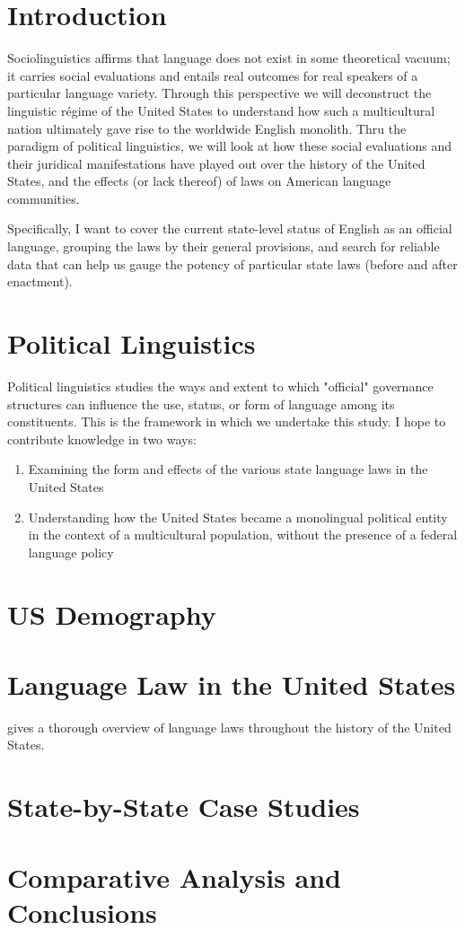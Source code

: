 \documentclass{article}
\begin{document}
\section*{Introduction}

Sociolinguistics affirms that language does not exist in some theoretical
vacuum; it carries social evaluations and entails real outcomes for real
speakers of a particular language variety. Through this perspective we will
deconstruct the linguistic régime of the United States to understand how such a
multicultural nation ultimately gave rise to the worldwide English monolith.
Thru the paradigm of political linguistics, we will look at how these social
evaluations and their juridical manifestations have played out over the history
of the United States, and the effects (or lack thereof) of laws on American
language communities.

Specifically, I want to cover the current state-level status of English as an
official language, grouping the laws by their general provisions, and search for
reliable data that can help us gauge the potency of particular state laws
(before and after enactment).

\section*{Political Linguistics}

Political linguistics studies the ways and extent to which "official" governance
structures can influence the use, status, or form of language among its
constituents. \cite{Calvet96} This is the framework in which we undertake this study. I hope to
contribute knowledge in two ways:

\begin{enumerate}
\item Examining the form and effects of the various state language laws in the
United States
\item Understanding how the United States became a monolingual political entity
in the context of a multicultural population, without the presence of a federal
language policy
\end{enumerate}

\section*{US Demography}

\section*{Language Law in the United States}

\cite{Baron92} gives a thorough overview of language laws throughout the history
of the United States.

\section*{State-by-State Case Studies}

\section*{Comparative Analysis and Conclusions}

\printbibliography
\end{document}
